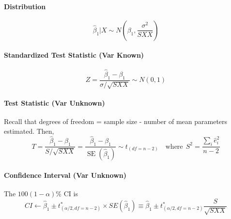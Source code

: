 \documentclass[10pt]{article}
\begin{document}
\paragraph{Distribution}
\begin{equation*}
    \hat{\beta}_{1} | X \sim N\left(\beta_{1}, \frac{\sigma^{2}}{S X X}\right)
\end{equation*}
\paragraph{Standardized Test Statistic (Var Known)}
\begin{equation*}
    Z=\frac{\hat{\beta}_{1}-\beta_{1}}{\sigma / \sqrt{S X X}} \sim N(0,1)
\end{equation*}
\paragraph{Test Statistic (Var Unknown)}
Recall that degrees of freedom = sample size - number of mean parameters estimated. Then,
\begin{equation*}
    T=\frac{\hat{\beta}_{1}-\beta_{1}}{S / \sqrt{S X X}}=\frac{\hat{\beta}_{1}-\beta_{1}}{\operatorname{SE}\left(\hat{\beta}_{1}\right)} \sim t_{(df=n-2)} \quad \text{where}~~ S^2 = \frac{\sum_i \hat{e}_i^2}{n-2} 
\end{equation*}
\paragraph{Confidence Interval (Var Unknown)}
The $100(1- \alpha)\%$ CI is
\begin{equation*}
    CI \gets \hat{\beta}_1 \pm t^\ast_{(\alpha/2, df=n-2)} \times SE(\hat{\beta}_1) \equiv \hat{\beta}_1 \pm t^\ast_{(\alpha/2, df=n-2)} \frac{S}{\sqrt{S X X}}
\end{equation*}
\end{document}
